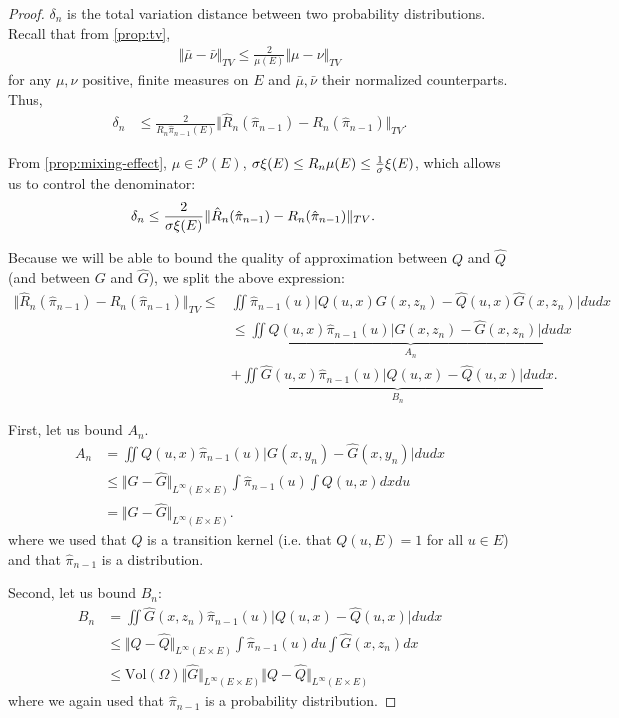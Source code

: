 \begin{proof}
$\delta_n$ is the total variation distance between two probability distributions. Recall that from \cref{prop:tv},
\begin{align}
    \Vert \bar \mu - \bar \nu\Vert_{TV} \leq \frac{2}{\mu(E)}\Vert \mu - \nu\Vert_{TV}
\end{align}
for any $\mu, \nu$ positive, finite measures on $E$ and $\bar \mu, \bar \nu$ their normalized counterparts.
Thus,
\begin{align}
    \delta_n & \leq \frac{2}{R_n\hat\pi_{n-1}(E)}\Vert\hat R_n(\hat\pi_{n-1}) - R_n(\hat\pi_{n-1})\Vert_{TV}.
\end{align}

From \cref{prop:mixing-effect}, $\mu\in\mathcal P(E)$, $\sigma\xi(E) \leq R_n\mu(E)\leq \frac{1}{\sigma}\xi(E)$, which allows us to control the denominator:
\begin{align}
    \delta_n & \leq \frac{2}{\sigma\xi(E)}\Vert\hat R_n(\hat\pi_{n-1}) - R_n(\hat\pi_{n-1})\Vert_{TV}.
\end{align}

Because we will be able to bound the quality of approximation between $Q$ and $\hat Q$ (and between $G$ and $\hat G$), we split the above expression:
\begin{align}
\Vert\hat R_n(\hat\pi_{n-1}) - R_n(\hat\pi_{n-1})\Vert_{TV} \leq& \iint \hat \pi_{n-1}(u)\vert Q(u, x)G(x, z_n) - \hat Q(u, x)\hat G(x, z_n)\vert dudx\\
& \leq \underbrace{\iint Q(u, x) \hat \pi_{n-1}(u)\vert G(x, z_n) - \hat G(x, z_n)\vert dudx}_{A_n}\label{eq:delta-a} \\
& + \underbrace{\iint \hat G(u, x) \hat \pi_{n-1}(u)\vert Q(u, x) - \hat Q(u, x)\vert dudx}_{B_n}.\label{eq:delta-b}
\end{align}

First, let us bound $A_n$.
\begin{align}
A_n &= \iint Q(u, x) \hat \pi_{n-1}(u)\vert G(x, y_n) - \hat G(x, y_n)\vert dudx\\
&\leq \Vert G-\hat G\Vert_{L^\infty(E\times E)}\int \hat\pi_{n-1}(u)\int Q(u,x)dxdu\\
&= \Vert G-\hat G\Vert_{L^\infty(E\times E)}.
\end{align}
where we used that $Q$ is a transition kernel (i.e. that $Q(u, E)=1$ for all $u\in E$) and that $\hat\pi_{n-1}$ is a distribution.

Second, let us bound $B_n$:
\begin{align}
B_n &= \iint \hat G(x, z_n) \hat \pi_{n-1}(u)\vert Q(u, x) - \hat Q(u, x)\vert dudx\\
    &\leq \Vert Q-\hat Q\Vert_{L^\infty(E\times E)}\int \hat \pi_{n-1}(u)du \int \hat G(x, z_n)dx\\
    &\leq \textrm{Vol}(\Omega)\Vert \hat G\Vert_{L^\infty(E\times E)}\Vert Q-\hat Q\Vert_{L^\infty(E\times E)}
\end{align}
where we again used that $\hat \pi_{n-1}$ is a probability distribution.
\end{proof}

